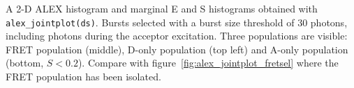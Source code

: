 \label{fig:alex_jointplot} A 2-D ALEX histogram and marginal E and S histograms obtained with \texttt{alex\_jointplot(ds)}. Bursts selected with a burst size threshold of 30 photons, including photons during the acceptor excitation. Three populations are visible: FRET population (middle), D-only population (top left) and A-only population (bottom, $S < 0.2$). Compare with figure~\ref{fig:alex_jointplot_fretsel} where the 
FRET population has been isolated.